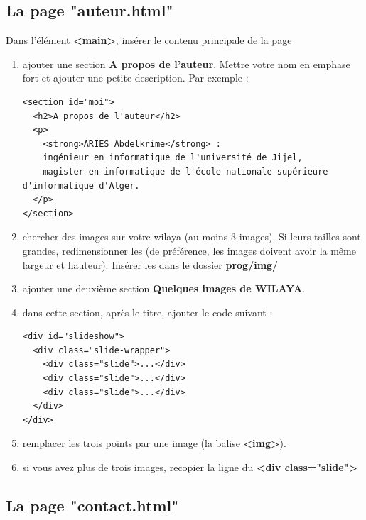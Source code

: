 \documentclass[11pt, a4paper]{article}
\begin{document}
\subsection*{La page "auteur.html"}

Dans l'élément \textbf{<main>}, insérer le contenu principale de la page  
\begin{enumerate}
	\item ajouter une section \textbf{A propos de l'auteur}. Mettre votre nom en emphase fort et ajouter une petite description. 
	Par exemple : 
\begin{verbatim}
<section id="moi">
  <h2>A propos de l'auteur</h2>
  <p>
    <strong>ARIES Abdelkrime</strong> :
    ingénieur en informatique de l'université de Jijel,
    magister en informatique de l'école nationale supérieure d'informatique d'Alger.
  </p>
</section>	
\end{verbatim}
	\item chercher des images sur votre wilaya (au moins 3 images). Si leurs tailles sont grandes, redimensionner les (de préférence, les images doivent avoir la même largeur et hauteur). 
	Insérer les dans le dossier \textbf{prog/img/}
	\item ajouter une deuxième section \textbf{Quelques images de WILAYA}. 
	\item dans cette  section, après le titre, ajouter le code suivant : 
\begin{verbatim}
<div id="slideshow">
  <div class="slide-wrapper">
    <div class="slide">...</div>
    <div class="slide">...</div>
    <div class="slide">...</div>
  </div>
</div>	
\end{verbatim}
	\item remplacer les trois points par une image (la balise \textbf{<img>}). 
	\item si vous avez plus de trois images, recopier la ligne du \textbf{<div class="slide">}
\end{enumerate}

\subsection*{La page "contact.html"}
\end{document}
